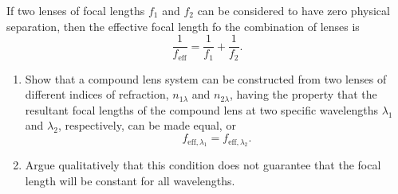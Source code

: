 \documentclass[main.tex]{subfiles}
\begin{document}
\begin{q}{4}
If two lenses of focal lengths $f_1$ and $f_2$ can be considered to have zero
physical separation, then the effective focal length fo the combination of
lenses is
\begin{equation}
    \frac{1}{f_{\text{eff}}} = \frac{1}{f_1} + \frac{1}{f_2}.
\end{equation}
\begin{enumerate}[label=\textbf{(\alph*)}]
    \item Show that a compound lens system can be constructed from two lenses of
    different indices of refraction, $n_{1\lambda}$ and $n_{2\lambda}$, having
    the property that the resultant focal lengths of the compound lens at two
    specific wavelengths $\lambda_1$ and $\lambda_2$, respectively, can be made
    equal, or
    \begin{equation}
        f_{\text{eff},\lambda_1} = f_{\text{eff},\lambda_2}.
    \end{equation}
    \item Argue qualitatively that this condition does not guarantee that the
    focal length will be constant for all wavelengths.
\end{enumerate}
\end{q}

\begin{sol}
\begin{subsol}
    
\end{subsol}

\begin{subsol}
    
\end{subsol}
\end{sol}
\end{document}
